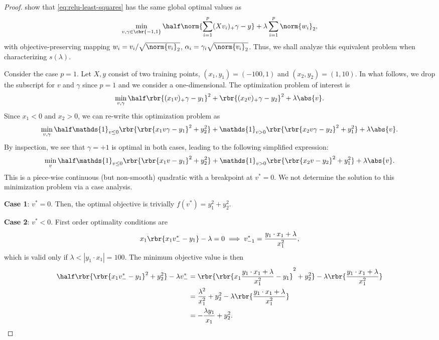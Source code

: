 
\begin{proof}
	\citet{mishkin2022convex} show that \autoref{eq:relu-least-squares} has the same global optimal values as
	\begin{equation*}
		\min_{v, \gamma \in \cbr{-1, 1}} \half \norm{\sum_{i=1}^p (X v_i)_+ \gamma - y} + \lambda \sum_{i = 1}^p \norm{w_i}_2,
	\end{equation*}
	with objective-preserving mapping \( w_i = v_i / \sqrt{\norm{v_i}_2} \),
	\( \alpha_i = \gamma_i \sqrt{\norm{v_i}_2} \).
	Thus, we shall analyze this equivalent problem when characterizing \( s(\lambda) \).

	Consider the case \( p = 1 \).
	Let \( X, y \) consist of two training points, \( (x_1, y_1) = (-100, 1) \) and \( (x_2, y_2) = (1, 10) \).
	In what follows, we drop the subscript for \( v \) and \( \gamma \) since \( p = 1 \) and we consider a one-dimensional.
	The optimization problem of interest is
	\begin{equation*}
		\min_{v, \gamma} \half \rbr{(x_1 v)_+ \gamma - y_1}^2 + \rbr{(x_2 v)_+ \gamma - y_2}^2 + \lambda \abs{v}.
	\end{equation*}
	Since \( x_1 < 0 \) and \( x_2 > 0 \), we can re-write this optimization problem as
	\[
		\min_{v, \gamma} \half \mathds{1}_{v \leq 0} \rbr{\rbr{x_1 v \gamma - y_1}^2 + y_2^2} + \mathds{1}_{v > 0}\rbr{\rbr{x_2 v \gamma - y_2}^2 + y_1^2} + \lambda \abs{v}.
	\]
	By inspection, we see that \( \gamma = +1 \) is optimal in both cases, leading to the following simplified expression:
	\[
		\min_{v} \half \mathds{1}_{v \leq 0} \rbr{\rbr{x_1 v - y_1}^2 + y_2^2} + \mathds{1}_{v > 0}\rbr{\rbr{x_2 v - y_2}^2 + y_1^2} + \lambda \abs{v}.
	\]
	This is a piece-wise continuous (but non-smooth) quadratic with a breakpoint at \( v^* = 0 \).
	We not determine the solution to this minimization problem via a case analysis.

	\textbf{Case 1}: \( v^* = 0 \).
	Then, the optimal objective is trivially \( f(v^*) = y_1^2 + y_2^2 \).

	\textbf{Case 2}: \( v^* < 0 \).
	First order optimality conditions are
	\[
		x_1 \rbr{x_1 v_{-}^* - y_1} - \lambda = 0 \implies v_{-1}^* = \frac{y_1 \cdot x_1 + \lambda}{x_1^2},
	\]
	which is valid only if \( \lambda < |y_1 \cdot x_1| = 100 \).
	The minimum objective value is then
	\begin{align*}
		\half \rbr{\rbr{x_1 v_{-}^* - y_1}^2 + y_2^2} - \lambda v_{-}^*
		 & = \rbr{\rbr{x_1 \frac{y_1 \cdot x_1 + \lambda}{x_1^2} - y_1}^2 + y_2^2} - \lambda \rbr{\frac{y_1 \cdot x_1 + \lambda}{x_1^2}} \\
		 & = \frac{\lambda^2}{x_1^2} + y_2^2 - \lambda \rbr{\frac{y_1 \cdot x_1 + \lambda}{x_1^2}}                                       \\
		 & = -\frac{\lambda y_1}{x_1} + y_2^2.
	\end{align*}


\end{proof}
